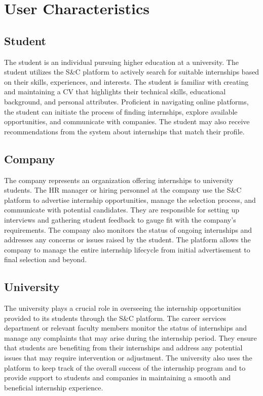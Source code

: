 \newpage
\section{User Characteristics}

\subsection{Student}
The student is an individual pursuing higher education at a university. The student utilizes the S\&C platform to actively search
for suitable internships based on their skills, experiences, and interests. The student is familiar
with creating and maintaining a CV that highlights their technical skills, educational background,
and personal attributes. Proficient in navigating online platforms, the student can initiate the
process of finding internships, explore available opportunities, and communicate with companies.
The student may also receive recommendations from the system about internships that match their profile.

\subsection{Company}
The company represents an organization offering internships to university students.
The HR manager or hiring personnel at the company use the S\&C platform to advertise
internship opportunities, manage the selection process, and communicate with potential
candidates. They are responsible for setting up interviews and gathering student feedback
to gauge fit with the company’s requirements. The company also monitors the status of
ongoing internships and addresses any concerns or issues raised by the student.
The platform allows the company to manage the entire internship lifecycle from initial
advertisement to final selection and beyond.

\subsection{University}
The university plays a crucial role in overseeing the internship opportunities provided to its
students through the S\&C platform. The career services department or relevant faculty members
monitor the status of internships and manage any complaints that may arise during the internship period.
They ensure that students are benefiting from their internships and address any potential issues
that may require intervention or adjustment. The university also uses the platform to keep track
of the overall success of the internship program and to provide support to students and companies
in maintaining a smooth and beneficial internship experience.

